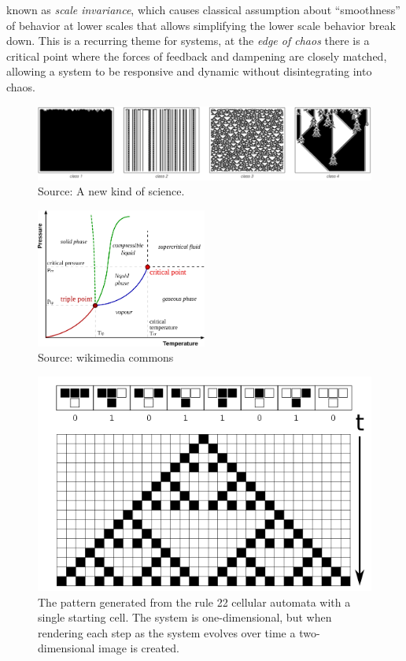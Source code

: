 known as \emph{scale invariance}, which causes classical assumption about
``smoothness'' of behavior at lower scales that allows simplifying the lower
scale behavior break down.
%
This is a recurring theme for systems, at the \emph{edge of chaos} there is a
critical point where the forces of feedback and dampening are closely matched,
allowing a system to be responsive and dynamic without disintegrating into
chaos.
\begin{figure}[h!]
  \centering
  \includegraphics[width=1.0\textwidth]{fig/classesCA.png}
  \caption{Source: A new kind of science.}
  \label{figPhase}
\end{figure}
\begin{figure}[h!]
  \centering
  \includegraphics[width=0.5\textwidth]{fig/Phase.png}
  \caption{Source: wikimedia commons}
  \label{figPhase}
\end{figure}
\begin{figure}[h!]
  \centering
  \includegraphics[width=1\textwidth]{fig/ca22t.png}
  \caption{
    The pattern generated from the rule 22 cellular automata with a
    single starting cell. The system is one-dimensional, but when rendering each
    step as the system evolves over time a two-dimensional image is created.
  }
  \label{figCA22}
\end{figure}
